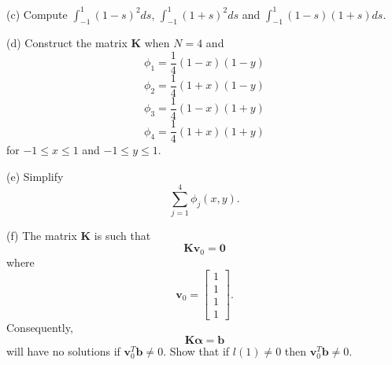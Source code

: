 \documentclass[11pt,twoside,reqno,a4paper]{amsart}
\begin{document}
(c) Compute $\displaystyle{\int_{-1}^1\left(1-s\right)^2ds}$,  $\displaystyle{\int_{-1}^1\left(1+s\right)^2ds}$ and $\displaystyle{\int_{-1}^1\left(1-s\right)\left(1+s\right)ds}$.

(d) Construct the matrix $\boldsymbol{K}$ when $N=4$ and
\[
\phi_1=\frac{1}{4}\left(1-x\right)\left(1-y\right)
\]
\[
\phi_2=\frac{1}{4}\left(1+x\right)\left(1-y\right)
\]
\[
\phi_3=\frac{1}{4}\left(1-x\right)\left(1+y\right)
\]
\[
\phi_4=\frac{1}{4}\left(1+x\right)\left(1+y\right)
\]
for $-1\le x\le1$ and $-1\le y\le1$.

(e) Simplify
\[
\sum_{j=1}^4\phi_j\left(x,y\right).
\]

(f) The matrix $\boldsymbol{K}$ is such that
\[
\boldsymbol{K}\boldsymbol{v}_0=\boldsymbol{0}
\]
where
\[
\boldsymbol{v}_0=\left[\begin{array}{c}1 \\ 1 \\ 1 \\ 1\end{array}\right].
\]
Consequently,
\[
\boldsymbol{K}\boldsymbol{\alpha}=\boldsymbol{b}
\]
will have no solutions if $\boldsymbol{v}_0^T\boldsymbol{b}\ne0$. Show that if $l\left(1\right)\ne0$ then $\boldsymbol{v}_0^T\boldsymbol{b}\ne0$.
\end{document}

